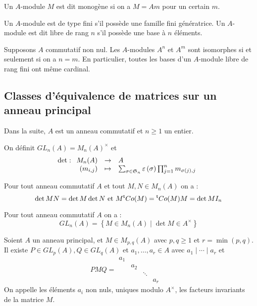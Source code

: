\documentclass{cours}
\begin{document}
\begin{definition}
    Un $A$-module $M$ est dit monogène si on a $M = Am$ pour un certain $m$.
\end{definition}

\begin{definition}
    Un $A$-module est de type fini s'il possède une famille fini génératrice. Un $A$-module est dit libre de rang $n$ s'il possède une base à $n$ éléments.
\end{definition}

\begin{theorem}
    Supposons $A$ commutatif non nul. Les $A$-modules $A^{n}$ et $A^{m}$ sont isomorphes si et seulement si on a $n = m$. En particulier, toutes les bases d'un $A$-module libre de rang fini ont même cardinal. 
\end{theorem}


\subsection{Classes d'équivalence de matrices sur un anneau principal}
Dans la suite, $A$ est un anneau commutatif et $n \geq 1$ un entier.

\begin{definition}
    On définit $GL_{n}(A) = M_{n}(A)^{\times}$ et 
    \[
        \det : \begin{array}[t]{rcl} M_{n}(A) & \to & A \\ \left(m_{i,j}\right) & \mapsto & \sum_{\sigma \in \mathfrak{S}_{n}}\varepsilon\left(\sigma\right)\prod_{j = 1}^{n}m_{\sigma(j), j} \end{array}
    \]
\end{definition}

\begin{lemma}
    Pour tout anneau commutatif $A$ et tout $M, N \in M_{n}(A)$ on a :
    \[
        \det MN = \det M \det N \text{ et } M{^{\mathsf{t}}}Co(M) = {^{\mathsf{t}}}Co(M)M = \det M I_{n}
    \] 
\end{lemma}

\begin{proposition}
    Pour tout anneau commutatif $A$ on a : 
    \[
        GL_{n}(A) = \left\{M \in M_{n}(A) \mid \det M \in A^{\times}\right\}
    \]
\end{proposition}

\begin{theorem}
    Soient $A$ un anneau principal, et $M \in M_{p, q}(A)$ avec $p,q \geq 1$ et $r = \min({p, q})$. Il existe $P \in GL_{p}(A), Q \in GL_{q}(A)$ et $a_{1}, \ldots, a_{r} \in A$ avec $a_{1}\mid \cdots \mid a_{r}$ et 
    \[
        PMQ = \begin{matrix}
            a_{1}& & & &\\
            & a_{2} & & &\\
            & & \ddots & &\\
            & & & a_{r} & 
        \end{matrix}
    \]
    On appelle les éléments $a_{i}$ non nuls, uniques modulo $A^{\times}$, les facteurs invariants de la matrice $M$. 
\end{theorem}
\end{document}
